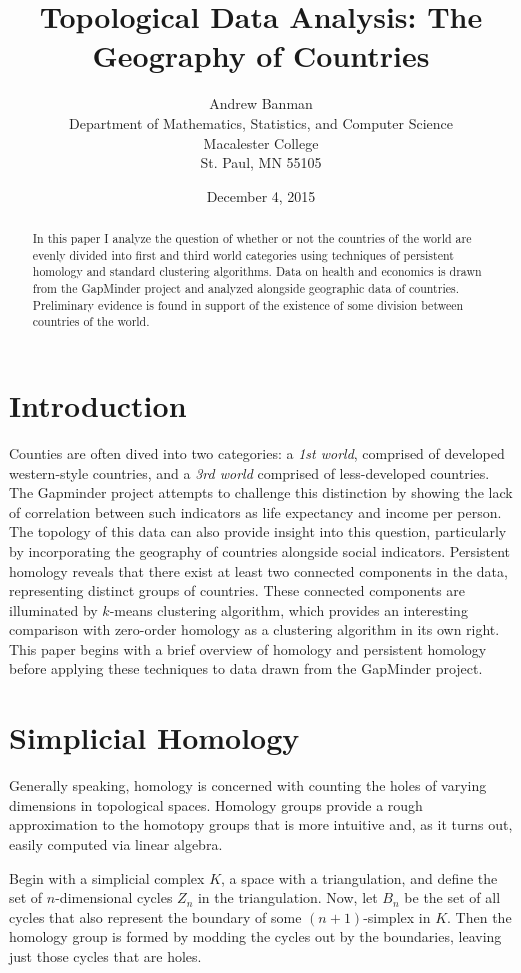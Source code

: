 \documentclass[11pt]{amsart}
\title{Topological Data Analysis: The Geography of Countries}
\author[Andrew Banman]{Andrew Banman \\  Department of Mathematics, Statistics, and Computer Science \\  Macalester College \\   St. Paul, MN 55105}
\date{December 4, 2015}
\theoremstyle{remark}	  \newtheorem*{remark}{Remark}
\numberwithin{equation}{section}
\begin{document}
\maketitle
\begin{abstract}
\noindent
In this paper I analyze the question of whether or not the countries of the world are evenly divided into first and third world categories using techniques of persistent homology and standard clustering algorithms. Data on health and economics is drawn from the GapMinder project and analyzed alongside geographic data of countries. Preliminary evidence is found in support of the existence of some division between countries of the world.
\end{abstract}


\section{Introduction}

Counties are often dived into two categories: a \emph{1st world}, comprised of developed western-style countries, and a \emph{3rd world} comprised of less-developed countries. The Gapminder project attempts to challenge this distinction by showing the lack of correlation between such indicators as life expectancy and income per person.\cite{gapminder}  The topology of this data can also provide insight into this question, particularly by incorporating the geography of countries alongside social indicators. Persistent homology reveals that there exist at least two connected components in the data, representing distinct groups of countries. These connected components are illuminated by $k$-means clustering algorithm, which provides an interesting comparison with zero-order homology as a clustering algorithm in its own right. This paper begins with a brief overview of homology and persistent homology before applying these techniques to data drawn from the GapMinder project. 

\section{Simplicial Homology}

Generally speaking,  homology is concerned with counting the holes of varying dimensions in topological spaces. Homology groups provide a rough approximation to the homotopy groups that is more intuitive and, as it turns out, easily computed via linear algebra. 

Begin with a simplicial complex $K$, a space with a triangulation, and define the set of $n$-dimensional cycles $Z_n$ in the triangulation. Now, let $B_n$ be the set of all cycles that also represent the boundary of some $(n+1)$-simplex in $K$. Then the homology group is formed by modding the cycles out by the boundaries, leaving just those cycles that are holes. 
\end{document}
